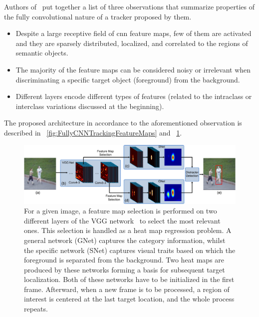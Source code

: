 Authors of~\cite{wang2015votcnn} put together a list of three observations that summarize properties of the fully convolutional nature of a tracker proposed by them.
\begin{itemize}
    \item Despite a large receptive field of \gls{cnn} feature maps, few of them are activated and they are sparsely distributed, localized, and correlated to the regions of semantic objects.
    \item The majority of the feature maps can be considered noisy or irrelevant when discriminating a specific target object (foreground) from the background.
    \item Different layers encode different types of features (related to the intraclass or interclass variations discussed at the beginning).
\end{itemize}
The proposed architecture in accordance to the aforementioned observation is described in \figstr{}~\ref{fig:FullyCNNTrackingFeatureMaps} and \figstr{}~\ref{fig:FullyCNNTrackingSNetGNet}.

\begin{figure}[t]
    \centerline{\includegraphics[width=\linewidth]{figures/theoretical_foundations/fully_cnn_tracking_snet_gnet.pdf}}
    \caption[Architecture of fully convolutional tracking]{For a given image, a feature map selection is performed on two different layers of the VGG network~\cite{simonyan2015verydeepcnn} to select the most relevant ones. This selection is handled as a heat map regression problem. A general network (GNet) captures the category information, whilst the specific network (SNet) captures visual traits based on which the foreground is separated from the background. Two heat maps are produced by these networks forming a basis for subsequent target localization. Both of these networks have to be initialized in the first frame. Afterward, when a new frame is to be processed, a region of interest is centered at the last target location, and the whole process repeats. }
    \label{fig:FullyCNNTrackingSNetGNet}
\end{figure}

